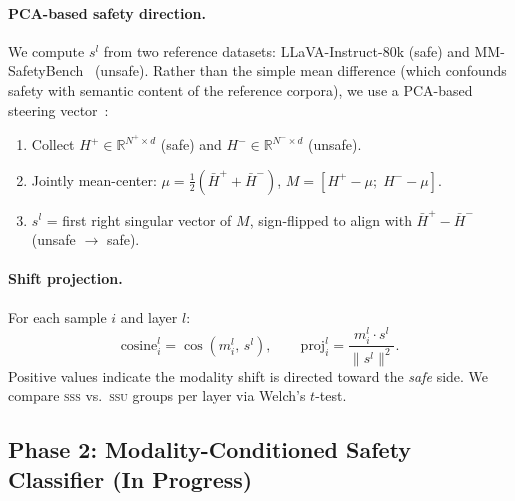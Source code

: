 \documentclass{article}
\newcommand{\ml}{m^l}
\newcommand{\safel}{s^l}
\begin{document}
\paragraph{PCA-based safety direction.}
We compute $\safel$ from two reference datasets: LLaVA-Instruct-80k (safe) and
MM-SafetyBench~\cite{liu2024mmsafetybench} (unsafe).
Rather than the simple mean difference (which confounds safety with semantic content of
the reference corpora), we use a PCA-based steering vector~\cite{zou2025shiftdc}:
\begin{enumerate}[noitemsep]
  \item Collect $H^+ \in \mathbb{R}^{N^+ \times d}$ (safe) and
        $H^- \in \mathbb{R}^{N^- \times d}$ (unsafe).
  \item Jointly mean-center: $\mu = \tfrac{1}{2}(\bar H^+ + \bar H^-)$,
        $M = [H^+ - \mu;\; H^- - \mu]$.
  \item $\safel$ = first right singular vector of $M$, sign-flipped to align with
        $\bar H^+ - \bar H^-$ (unsafe $\to$ safe).
\end{enumerate}

\paragraph{Shift projection.}
For each sample $i$ and layer $l$:
\begin{equation}
  \text{cosine}^l_i = \cos(\ml_i,\,\safel), \qquad
  \text{proj}^l_i   = \frac{\ml_i \cdot \safel}{\|\safel\|^2}.
\end{equation}
Positive values indicate the modality shift is directed toward the \emph{safe} side.
We compare \textsc{sss} vs.\ \textsc{ssu} groups per layer via Welch's $t$-test.

\subsection{Phase 2: Modality-Conditioned Safety Classifier (In Progress)}
\end{document}
